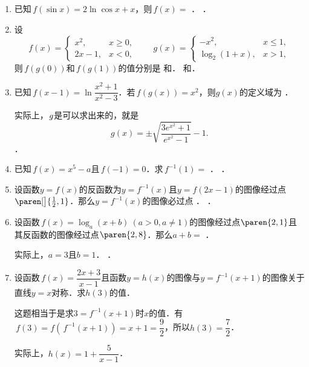 \begin{enumerate}
\item 已知\(\,f(\sin x) = 2 \ln \cos x + x\)，则\(\,f(x) =\)
  \ifshowsol
    \uline{}．
  \else
    \uline{\makebox[16em]{}}．
  \fi

\item 设
  \[
    f(x) =
    \begin{cases}
      x^2, & x \ge 0, \\
      2x - 1, & x < 0,
    \end{cases}
    \qquad
    g(x) =
    \begin{cases}
      -x^2, & x \le 1, \\
      \log_2(1+x), & x > 1,
    \end{cases}
  \]
  则\(\,f(g(0))\)和\(\,f(g(1))\)的值分别是
  \ifshowsol
    \uline{}和\uline{}．
  \else
    \uline{\makebox[3em]{}}和\uline{\makebox[3em]{}}．
  \fi

\item 已知\(\,f(x-1) = \ln \dfrac{x^2+1}{x^2-3}\)．若\(\,f(g(x)) = x^2\)，则\(g(x)\)的定义域为
  \ifshowsol
    \uline{}．

    实际上，\(\mkern1mu g\)是可以求出来的，就是
    \[
      g(x) = \pm \sqrt{\frac{3e^{x^2}+1}{e^{x^2}-1}} - 1.
    \]
  \else
    \uline{\makebox[10em]{}}．
  \fi

\item 已知\(\,f(x) = x^5 - a\)且\(\,f(-1) = 0\)．求\(\,f^{-1}(1) =\)
  \ifshowsol
    \uline{}．
  \else
    \uline{\makebox[3em]{}}．
  \fi

\item 设函数\(y = f(x)\)的反函数为\(y = f^{-1}(x)\)且\(y = f(2x-1)\)的图像经过点\(\paren[\big]{\frac12, 1}\)．那么\(y = f^{-1}(x)\)的图像必过点
  \ifshowsol
    \uline{}．
  \else
    \uline{\makebox[3em]{}}．
  \fi

\item 设函数\(\,f(x) = \log_a(x+b)\ (a > 0, a \ne 1)\)的图像经过点\(\paren{2,1}\)且其反函数的图像经过点\(\paren{2,8}\)．那么\(a + b =\)
  \ifshowsol
    \uline{}．

    实际上，\(a = 3\)且\(b = 1\)．
  \else
    \uline{\makebox[3em]{}}．
  \fi

\item 设函数\(\,f(x) = \dfrac{2x+3}{x-1}\)且函数\(y = h(x)\)的图像与\(y = f^{-1}(x+1)\)的图像关于直线\(y = x\)对称．求\(h(3)\)的值．

  \ifshowsol
    这题相当于是求\(3 = f^{-1}(x+1)\)时\(x\)的值．有\(\,f(3) = f(\,f^{-1}(x+1)) = x+1 = \dfrac92\)，所以\(h(3) = \dfrac72\)．

    实际上，\(h(x) = 1 + \dfrac{5}{x-1}\)．
  \fi

\end{enumerate}
\fi

